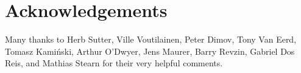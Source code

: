 \section*{Acknowledgements}

Many thanks to Herb Sutter, Ville Voutilainen, Peter Dimov, Tony Van Eerd, Tomasz Kami\' nski, Arthur O'Dwyer, Jens Maurer, Barry Revzin, Gabriel Dos Reis, and Mathias Stearn for their very helpful comments.

\renewcommand{\bibname}{References}



